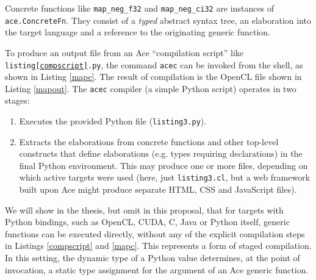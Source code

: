 Concrete functions like \verb|map_neg_f32| and \verb|map_neg_ci32| are instances of \verb|ace.ConcreteFn|. They consist of a \emph{typed} abstract syntax tree, an elaboration into the target language and a reference to the originating generic function. %

To produce an output file from an Ace ``compilation script'' like \verb|listing|\texttt{\ref{compscript}}\verb|.py|, the command \verb|acec| can be invoked from the shell, as shown in Listing \ref{mapc}. The result of compilation is the OpenCL file shown in Listing \ref{mapout}. The \verb|acec| compiler (a simple Python script) operates in two stages:
\begin{enumerate}
\item Executes the provided Python file (\verb|listing3.py|).
\item Extracts the elaborations from concrete functions and other top-level constructs that define elaborations (e.g. types requiring declarations) in the final Python environment.  This may produce one or more files, depending on which active targets were used (here, just \verb|listing3.cl|, but a web framework built upon Ace might produce separate HTML, CSS and JavaScript files).
\end{enumerate}

We will show in the thesis, but omit in this proposal, that for targets with Python bindings, such as OpenCL, CUDA, C, Java or Python itself, generic functions can be executed directly, without any of the explicit compilation steps in Listings \ref{compscript} and \ref{mapc}. This represents a form of staged compilation.  In this setting, the dynamic type of a Python value determines, at the point of invocation, a static type assignment for the argument of an Ace generic function. 

